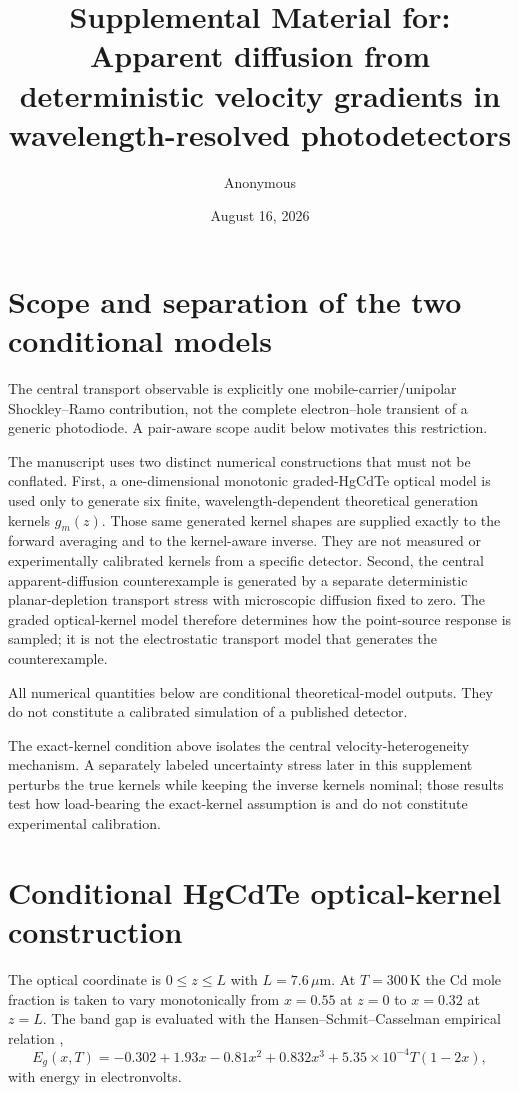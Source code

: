 \documentclass[aps,pra,onecolumn,superscriptaddress,nofootinbib]{revtex4-2}
\begin{document}
\title{Supplemental Material for: Apparent diffusion from deterministic velocity gradients in wavelength-resolved photodetectors}
\author{Anonymous}
\date{August 16, 2026}
\maketitle

\section{Scope and separation of the two conditional models}

The central transport observable is explicitly one mobile-carrier/unipolar Shockley--Ramo contribution, not the complete electron--hole transient of a generic photodiode. A pair-aware scope audit below motivates this restriction.

The manuscript uses two distinct numerical constructions that must not be conflated.  First, a one-dimensional monotonic graded-HgCdTe optical model is used only to generate six finite, wavelength-dependent theoretical generation kernels $g_m(z)$.  Those same generated kernel shapes are supplied exactly to the forward averaging and to the kernel-aware inverse.  They are not measured or experimentally calibrated kernels from a specific detector.  Second, the central apparent-diffusion counterexample is generated by a separate deterministic planar-depletion transport stress with microscopic diffusion fixed to zero.  The graded optical-kernel model therefore determines how the point-source response is sampled; it is not the electrostatic transport model that generates the counterexample.

All numerical quantities below are conditional theoretical-model outputs.  They do not constitute a calibrated simulation of a published detector.

The exact-kernel condition above isolates the central velocity-heterogeneity mechanism. A separately labeled uncertainty stress later in this supplement perturbs the true kernels while keeping the inverse kernels nominal; those results test how load-bearing the exact-kernel assumption is and do not constitute experimental calibration.


\section{Conditional HgCdTe optical-kernel construction}

The optical coordinate is $0\le z\le L$ with $L=7.6\,\mu\mathrm{m}$.  At $T=300\,\mathrm{K}$ the Cd mole fraction is taken to vary monotonically from $x=0.55$ at $z=0$ to $x=0.32$ at $z=L$.  The band gap is evaluated with the Hansen--Schmit--Casselman empirical relation \cite{hansen1982gap},
\begin{equation}
E_g(x,T)=-0.302+1.93x-0.81x^2+0.832x^3+5.35\times10^{-4}T(1-2x),
\end{equation}
with energy in electronvolts.
\end{document}
